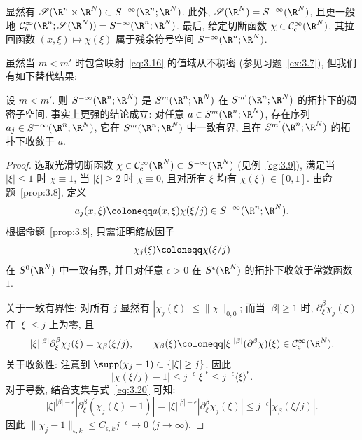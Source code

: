 \begin{example}[符号, III]\label{eg:3.9}
显然有 $\Schwartz(\R^n \times \R^N) \subset S^{-\infty}(\R^n; \R^N)$. 此外, $\Schwartz(\R^N) = S^{-\infty}(\R^N)$, 且更一般地 $\mathcal{C}_b^\infty(\R^n; \Schwartz(\R^N)) = S^{-\infty}(\R^n; \R^N)$. 最后, 给定切断函数 $\chi \in \SmoothComp(\R^N)$, 其拉回函数 $(x, \xi) \mapsto \chi(\xi)$ 属于残余符号空间 $S^{-\infty}(\R^n; \R^N)$.
\end{example}

虽然当 $m < m'$ 时包含映射~\eqref{eq:3.16} 的值域从不稠密 (参见习题~\ref{ex:3.7}), 但我们有如下替代结果:

\begin{proposition}[符号空间的稠密性]\label{prop:3.10}
设 $m < m'$. 则 $S^{-\infty}(\R^n; \R^N)$ 是 $S^m(\R^n; \R^N)$ 在 $S^{m'}(\R^n; \R^N)$ 的拓扑下的稠密子空间. 事实上更强的结论成立: 对任意 $a \in S^m(\R^n; \R^N)$, 存在序列 $a_j \in S^{-\infty}(\R^n; \R^N)$, 它在 $S^m(\R^n; \R^N)$ 中一致有界, 且在 $S^{m'}(\R^n; \R^N)$ 的拓扑下收敛于 $a$.
\end{proposition}

\begin{proof}
选取光滑切断函数 $\chi \in \SmoothComp(\R^N) \subset S^{-\infty}(\R^N)$ (见例~\ref{eg:3.9}), 满足当 $|\xi| \le 1$ 时 $\chi \equiv 1$, 当 $|\xi| \ge 2$ 时 $\chi \equiv 0$, 且对所有 $\xi$ 均有 $\chi(\xi) \in [0, 1]$. 由命题~\ref{prop:3.8}, 定义
\begin{equation}\label{eq:3.18}
    a_j(x, \xi) \defeq a(x, \xi) \chi(\xi / j) \in S^{-\infty}(\R^n; \R^N).
\end{equation}
根据命题~\ref{prop:3.8}, 只需证明缩放因子
\begin{equation}\label{eq:3.19}
    \chi_j(\xi) \defeq \chi(\xi / j)
\end{equation}
在 $S^0(\R^N)$ 中一致有界, 并且对任意 $\epsilon > 0$ 在 $S^\epsilon(\R^N)$ 的拓扑下收敛于常数函数 $1$.

关于一致有界性: 对所有 $j$ 显然有 $|\chi_j(\xi)| \le \|\chi\|_{0, 0}$; 而当 $|\beta| \ge 1$ 时, $\partial_\xi^\beta \chi_j(\xi)$ 在 $|\xi| \le j$ 上为零, 且
\begin{equation}\label{eq:3.20}
    |\xi|^{|\beta|} \partial_\xi^\beta \chi_j(\xi) = \chi_\beta(\xi / j), \qquad \chi_\beta(\xi) \defeq |\xi|^{|\beta|} (\partial^\beta \chi)(\xi) \in \SmoothComp(\R^N).
\end{equation}
关于收敛性: 注意到 $\supp(\chi_j - 1) \subset \{|\xi| \ge j\}$. 因此
\begin{equation}\label{eq:3.21}
    |\chi(\xi / j) - 1| \le j^{-\epsilon} |\xi|^\epsilon \le j^{-\epsilon} \langle \xi \rangle^\epsilon.
\end{equation}
对于导数, 结合支集与式~\eqref{eq:3.20} 可知:
\begin{equation}\label{eq:3.22}
    |\xi|^{|\beta| - \epsilon} |\partial_\xi^\beta (\chi_j(\xi) - 1)| = |\xi|^{|\beta| - \epsilon} |\partial_\xi^\beta \chi_j(\xi)| \le j^{-\epsilon} |\chi_\beta(\xi / j)|.
\end{equation}
因此 $\|\chi_j - 1\|_{\epsilon, k} \le C_{\epsilon, k} j^{-\epsilon} \to 0$ ($j \to \infty$).
\end{proof}

